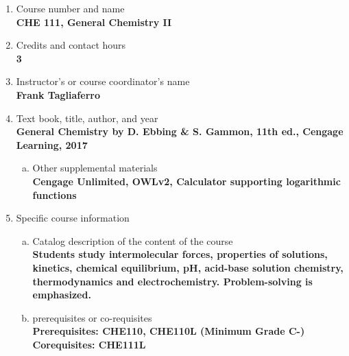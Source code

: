 \label{CHE111}  %
\begin{enumerate}[1.]
\item Course number and name\\
  {\bfseries
CHE 111, General Chemistry II
  }

\item Credits and contact hours\\
  {\bfseries
3
  }

\item Instructor's or course coordinator's name\\
  {\bfseries
    Frank Tagliaferro
  }

\item Text book, title, author, and year\\
  {\bfseries
  General Chemistry by D. Ebbing \& S. Gammon, 11th ed., Cengage Learning, 2017
  }
\begin{enumerate}[a.]
\item Other supplemental materials\\
  {\bfseries
Cengage Unlimited, OWLv2, Calculator supporting logarithmic functions
  }
\end{enumerate}

\item Specific course information
\begin{enumerate}[a.]
\item Catalog description of the content of the course\\
  {\bfseries
Students study intermolecular forces, properties of solutions, kinetics, chemical equilibrium, pH, acid-base solution chemistry, thermodynamics and electrochemistry. Problem-solving is emphasized.
  }

\item prerequisites or co-requisites\\
  {\bfseries
    Prerequisites: CHE110, CHE110L (Minimum Grade C-)\\
    Corequisites: CHE111L
  }


\end{enumerate}
\end{enumerate}
